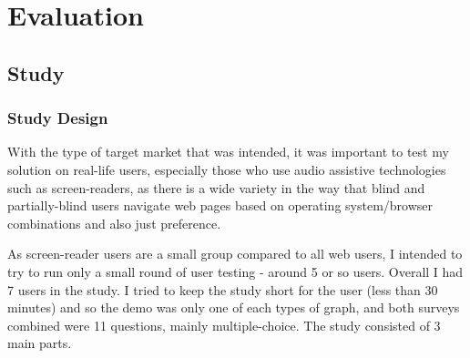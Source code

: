 \documentclass[ %
                    author={Aleena Baig},
                supervisor={Dr Simon Lock},
                    degree={BSc},
                     title={On Making Web Accessible Graphs},
                  subtitle={},
                      year={2019} ]{dissertation}
\begin{document}
\chapter{Evaluation}

\section{Study}

\subsection{Study Design}



With the type of target market that was intended, it was important to test my solution on real-life users, especially those who use audio assistive technologies such as screen-readers, as there is a wide variety in the way that blind and partially-blind users navigate web pages based on operating system/browser combinations and also just preference.

As screen-reader users are a small group compared to all web users, I intended to try to run only a small round of user testing - around 5 or so users. Overall I had 7 users in the study. I tried to keep the study short for the user (less than 30 minutes) and so the demo was only one of each types of graph, and both surveys combined were 11 questions, mainly multiple-choice. The study consisted of 3 main parts. 
\end{document}
